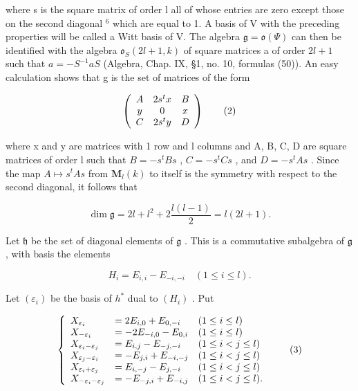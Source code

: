 where s is the square matrix of order l all of whose entries are zero except those on the second diagonal \(^{6}\) which are equal to 1. A basis of V with the preceding properties will be called a Witt basis of V. The algebra \(\mathfrak{g} = \mathfrak{o}(\varPsi)\) can then be identified with the algebra \(\mathfrak{o}_{S}(2l + 1, k)\) of square matrices a of order \(2l + 1\) such that \(a = -S^{-1}aS\) (Algebra, Chap. IX, §1, no. 10, formulas (50)). An easy calculation shows that g is the set of matrices of the form

\[
\left( \begin{array}{c c c} A & 2 s ^ {t} x & B \\ y & 0 & x \\ C & 2 s ^ {t} y & D \end{array} \right)\tag{2}
\]

where x and y are matrices with 1 row and l columns and A, B, C, D are square matrices of order l such that \(B = -s^{t}Bs\) , \(C = -s^{t}Cs\) , and \(D = -s^{t}As\) . Since the map \(A \mapsto s^{t}As\) from \(\mathbf{M}_{l}(k)\) to itself is the symmetry with respect to the second diagonal, it follows that

\[
\dim \mathfrak {g} = 2 l + l ^ {2} + 2 \frac {l (l - 1)}{2} = l (2 l + 1).
\]

Let \(\mathfrak{h}\) be the set of diagonal elements of \(\mathfrak{g}\) . This is a commutative subalgebra of \(\mathfrak{g}\) , with basis the elements


\[
H _ {i} = E _ {i, i} - E _ {- i, - i} \quad (1 \leq i \leq l).
\]

Let \((\varepsilon_{i})\) be the basis of \(h^{*}\) dual to \((H_{i})\) . Put

\[
\left\{ \begin{array}{l l l} X _ {\varepsilon_ {i}} & = 2 E _ {i, 0} + E _ {0, - i} & (1 \leq i \leq l) \\ X _ {- \varepsilon_ {i}} & = - 2 E _ {- i, 0} - E _ {0, i} & (1 \leq i \leq l) \\ X _ {\varepsilon_ {i} - \varepsilon_ {j}} & = E _ {i, j} - E _ {- j, - i} & (1 \leq i <   j \leq l) \\ X _ {\varepsilon_ {j} - \varepsilon_ {i}} & = - E _ {j, i} + E _ {- i, - j} & (1 \leq i <   j \leq l) \\ X _ {\varepsilon_ {i} + \varepsilon_ {j}} & = E _ {i, - j} - E _ {j, - i} & (1 \leq i <   j \leq l) \\ X _ {- \varepsilon_ {i} - \varepsilon_ {j}} & = - E _ {- j, i} + E _ {- i, j} & (1 \leq i <   j \leq l). \end{array} \right.\tag{3}
\]

